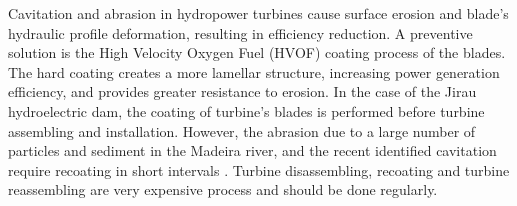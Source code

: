 Cavitation and abrasion in hydropower turbines cause surface erosion and
blade's hydraulic profile deformation, resulting in efficiency
reduction. A preventive solution is the High Velocity Oxygen Fuel (HVOF) coating
process of the blades. The hard coating creates a more lamellar structure,
increasing power generation efficiency, and provides greater
resistance to erosion. In the case of the Jirau hydroelectric dam, the coating
of turbine's blades is performed before turbine assembling and
installation. However, the abrasion due to a large number
of particles and sediment in the Madeira river, and the recent identified
cavitation require recoating in short intervals \citep{santa2009slurry}. Turbine
disassembling, recoating and turbine reassembling are very expensive process
and should be done regularly.


